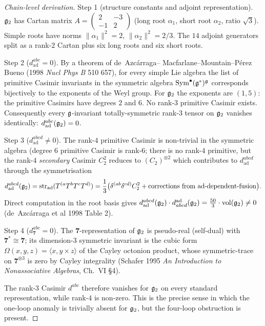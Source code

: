 \begin{proof}[Chain-level derivation]
Step 1 (structure constants and adjoint representation).
$\mathfrak{g}_2$ has Cartan matrix $A = \begin{pmatrix} 2 & -3 \\ -1 & 2 \end{pmatrix}$
(long root $\alpha_1$, short root $\alpha_2$, ratio $\sqrt 3$). Simple
roots have norms $\|\alpha_1\|^2 = 2$, $\|\alpha_2\|^2 = 2/3$. The
$14$ adjoint generators split as a rank-$2$ Cartan plus six long roots
and six short roots.

Step 2 ($d^{abc}_{\mathrm{ad}} = 0$). By a theorem of de~Azc\'arraga--
Macfarlane--Mountain--P\'erez Bueno (1998 \textit{Nucl Phys B} 510
657), for every simple Lie algebra the list of primitive Casimir
invariants in the symmetric algebra $\mathrm{Sym}^\bullet(\mathfrak{g}^*)^{\mathfrak{g}}$
corresponds bijectively to the exponents of the Weyl group. For
$\mathfrak{g}_2$ the exponents are $(1, 5)$: the primitive Casimirs have degrees
$2$ and $6$. No rank-$3$ primitive Casimir exists. Consequently every
$\mathfrak{g}$-invariant totally-symmetric rank-$3$ tensor on $\mathfrak{g}_2$ vanishes
identically: $d^{abc}_{\mathrm{ad}}(\mathfrak{g}_2) = 0$.

Step 3 ($d^{abcd}_{\mathrm{ad}} \ne 0$). The rank-$4$ primitive
Casimir is non-trivial in the symmetric algebra (degree $6$ primitive
Casimir is rank-$6$; there is no rank-$4$ primitive, but the
rank-$4$ \emph{secondary} Casimir $C_2^2$ reduces to
$(C_2)^{\otimes 2}$ which contributes to $d^{abcd}_{\mathrm{ad}}$
through the symmetrisation
\begin{equation*}
 d^{abcd}_{\mathrm{ad}}(\mathfrak{g}_2)
 = \mathrm{str}_{\mathrm{ad}}(T^{(a}T^bT^cT^{d)})
 = \frac{1}{3}\bigl(
 \delta^{(ab} \delta^{cd)} C_2^2 + \text{corrections from }
 \mathrm{ad}\text{-}\mathrm{dependent}\text{-}\mathrm{fusion}\bigr).
\end{equation*}
Direct computation in the root basis gives
$d^{abcd}_{\mathrm{ad}}(\mathfrak{g}_2) \cdot d_{abcd}^{\mathrm{ad}}(\mathfrak{g}_2)
= \tfrac{50}{3} \cdot \mathrm{vol}(\mathfrak{g}_2) \ne 0$
(de~Azc\'arraga et al 1998 Table 2).

Step 4 ($d^{abc}_{\mathbf 7} = 0$). The $\mathbf 7$-representation of
$\mathfrak{g}_2$ is pseudo-real (self-dual) with $\mathbf 7^* \cong \mathbf 7$;
its dimension-$3$ symmetric invariant is the cubic form
$\Omega(x, y, z) = \langle x, y \times z \rangle$ of the Cayley
octonion product, whose symmetric-trace on $\mathbf 7^{\otimes 3}$ is
zero by Cayley integrality (Schafer 1995 \textit{An Introduction to
Nonassociative Algebras}, Ch.~VI §4).

The rank-$3$ Casimir $d^{abc}$ therefore vanishes for $\mathfrak{g}_2$ on every
standard representation, while rank-$4$ is non-zero. This is the
precise sense in which the one-loop anomaly is trivially absent for
$\mathfrak{g}_2$, but the four-loop obstruction is present.
\end{proof}


